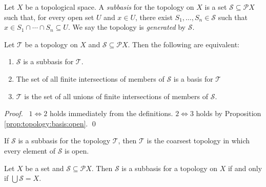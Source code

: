 \begin{df}[Subbasis]
  Let $X$ be a topological space. A \emph{subbasis} for the topology on $X$
  is
  a set $\mathcal{S} \subseteq \mathcal{P} X$ such that, for every open set
  $U$
  and $x \in U$, there exist $S_1, \ldots, S_n \in \mathcal{S}$ such that $x
  \in S_1 \cap \cdots \cap S_n \subseteq U$. We say the topology is
  \emph{generated} by $\mathcal{S}$.
\end{df}

\begin{lm}
  \label{lm:topology:subbasis:generate}
  Let $\mathcal{T}$ be a topology on $X$ and $\mathcal{S}
  \subseteq \mathcal{P} X$.   Then the following are equivalent:
  \begin{enumerate}
    \item $\mathcal{S}$ is a subbasis for $\mathcal{T}$.
    \item The set of all finite intersections of members of $\mathcal{S}$ is
    a
    basis for $\mathcal{T}$
    \item $\mathcal{T}$ is the set of all unions of finite intersections of
    members of $\mathcal{S}$.
  \end{enumerate}
\end{lm}

\begin{proof}
  \pf\ $1 \Leftrightarrow 2$ holds immediately from the definitions. $2
  \Leftrightarrow 3$ holds by Proposition \ref{prop:topology:basis:open}. \qed
\end{proof}

\begin{cor}
  \label{cor:topology:subbasis:coarsest}
  If $\mathcal{S}$ is a subbasis for the topology $\mathcal{T}$, then
  $\mathcal{T}$ is the coarsest topology in which every element of
  $\mathcal{S}$ is open.
\end{cor}

\begin{lm}
  Let $X$ be a set and $\mathcal{S} \subseteq \mathcal{P} X$. Then
  $\mathcal{S}$ is a subbasis for a topology on $X$ if and only if $\bigcup
  \mathcal{S} = X$.
\end{lm}

